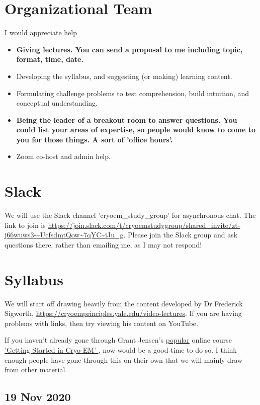 \documentclass[11pt, oneside]{article}   	%
\begin{document}
\section{Organizational Team}

I would appreciate help 
\begin{itemize}
	\item {\bf Giving lectures. You can send a proposal to me including topic, format, time, date.}
	\item Developing the syllabus, and suggesting (or making) learning content.
	\item Formulating challenge problems to test comprehension, build intuition, and conceptual understanding.
	\item {\bf Being the leader of a breakout room to answer questions. You could list your areas of expertise, so people would know to come to you for those things. A sort of 'office hours'.}
	\item Zoom co-host and admin help.
\end{itemize}

\section{Slack}
We will use the Slack channel 'cryoem\_study\_group' for asynchronous chat. The link to join is 
{\tiny \url{https://join.slack.com/t/cryoemstudygroup/shared\_invite/zt-j66wuws3-~UcfsdmtQow~7qYC~iJu\_g}}. Please join the Slack group and ask questions there, rather than emailing me, as I may not respond!

\section{Syllabus}
We will start off drawing heavily from the content developed by Dr Frederick Sigworth, \url{https://cryoemprinciples.yale.edu/video-lectures}. If you are having problems with links, then try viewing his content on YouTube.

If you haven't already gone through Grant Jensen's \href{https://www.caltech.edu/about/news/grant-jensen-cryo-em}{popular} online course \href{https://jensenlab.caltech.edu/courses/}{'Getting Started in Cryo-EM' }, now would be a good time to do so. I think enough people have gone through this on their own that we will mainly draw from other material. 

\pagebreak
\subsection{19 Nov 2020}
\end{document}
